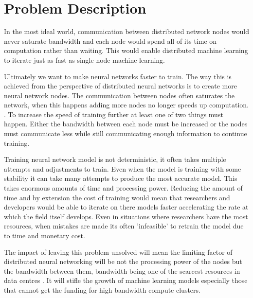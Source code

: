 \clearpage
\section{Problem Description}

In the most ideal world, communication between distributed network nodes would
never saturate bandwidth and each node would spend all of its time on
computation rather than waiting. This would enable distributed machine learning
to iterate just as fast as single node machine learning.

Ultimately we want to make neural networks faster to train. The way this is
achieved from the perspective of distributed neural networks is to create more
neural network nodes. The communication between nodes often saturates the
network, when this happens adding more nodes no longer speeds up computation.
\cite{li2014communication}. To increase the speed of training further at least
one of two things must happen. Either the bandwidth between each node must be
increased or the nodes must communicate less while still communicating enough
information to continue training.
\par
Training neural network model is not deterministic, it often takes multiple
attempts and adjustments to train. Even when the model is training with some
stability it can take many attempts to produce the most accurate model. This
takes enormous amounts of time and processing power. Reducing the amount of time
and by extension the cost of training would mean that researchers and developers
would be able to iterate on there models faster accelerating the rate at which
the field itself develops. Even in situations where researchers have the most
resources, when mistakes are made its often 'infeasible' to retrain the model
due to time and monetary cost. \cite{fewshowlearners2020gpt}
\par
The impact of leaving this problem unsolved will mean the limiting factor of
distributed neural networking will be not the processing power of the nodes but
the bandwidth between them, bandwidth being one of the scarcest resources in
data centres \cite{LuizDatacenterAsAComputer}. It will stifle the growth of
machine learning models especially those that cannot get the funding for high
bandwidth compute clusters.

